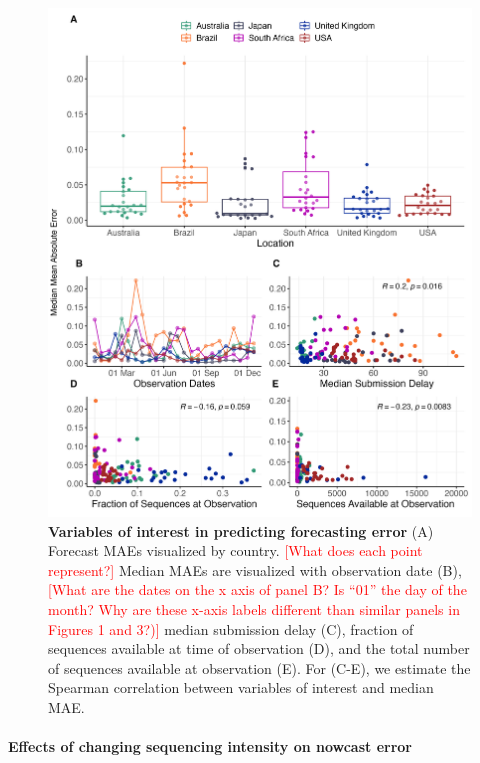 \documentclass[11pt,oneside,letterpaper]{article}
\def\jhc#1{\textcolor{red}{[#1]}}
\begin{document}
\begin{figure}[H]
	\centering
    \includegraphics[width=1.1\textwidth]{figures/Var_of_interest.png}
	\caption{\textbf{Variables of interest in predicting forecasting error}
    (A) Forecast MAEs visualized by country. %
    \jhc{What does each point represent?}
    Median MAEs are visualized with observation date (B),
    \jhc{What are the dates on the x axis of panel B? Is ``01'' the day of the month? Why are these x-axis labels different than similar panels in Figures 1 and 3?)}
    median submission delay (C),
    fraction of sequences available at time of observation (D),
    and the total number of sequences available at observation (E).
    For (C-E), we estimate the Spearman correlation between variables of interest and median MAE.
	}
	\label{fig:vars_of_interest}
\end{figure}

\paragraph{Effects of changing sequencing intensity on nowcast error}%
\end{document}
